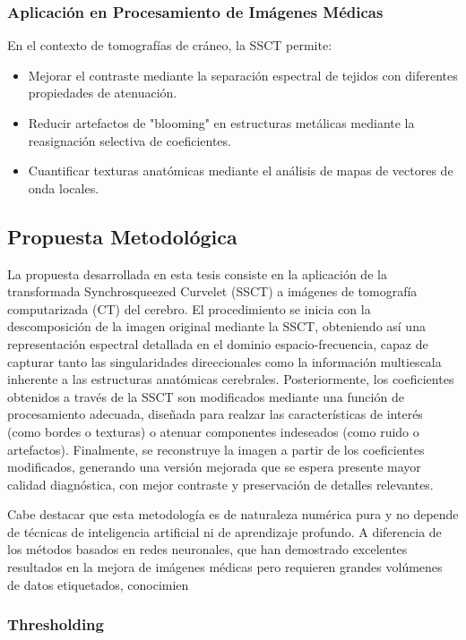 \subsubsection{Aplicación en Procesamiento de Imágenes Médicas}

En el contexto de tomografías de cráneo, la SSCT permite:
\begin{itemize}
    \item Mejorar el contraste mediante la separación espectral de tejidos con diferentes propiedades de atenuación.
    \item Reducir artefactos de "blooming" en estructuras metálicas mediante la reasignación selectiva de coeficientes.
    \item Cuantificar texturas anatómicas mediante el análisis de mapas de vectores de onda locales.
\end{itemize}

\subsection{Propuesta Metodológica}

La propuesta desarrollada en esta tesis consiste en la aplicación de la transformada Synchrosqueezed Curvelet (SSCT) a imágenes de tomografía computarizada (CT) del cerebro. El procedimiento se inicia con la descomposición de la imagen original mediante la SSCT, obteniendo así una representación espectral detallada en el dominio espacio-frecuencia, capaz de capturar tanto las singularidades direccionales como la información multiescala inherente a las estructuras anatómicas cerebrales. Posteriormente, los coeficientes obtenidos a través de la SSCT son modificados mediante una función de procesamiento adecuada, diseñada para realzar las características de interés (como bordes o texturas) o atenuar componentes indeseados (como ruido o artefactos). Finalmente, se reconstruye la imagen a partir de los coeficientes modificados, generando una versión mejorada que se espera presente mayor calidad diagnóstica, con mejor contraste y preservación de detalles relevantes.

Cabe destacar que esta metodología es de naturaleza numérica pura y no depende de técnicas de inteligencia artificial ni de aprendizaje profundo. A diferencia de los métodos basados en redes neuronales, que han demostrado excelentes resultados en la mejora de imágenes médicas pero requieren grandes volúmenes de datos etiquetados, conocimien

\subsubsection{Thresholding}

